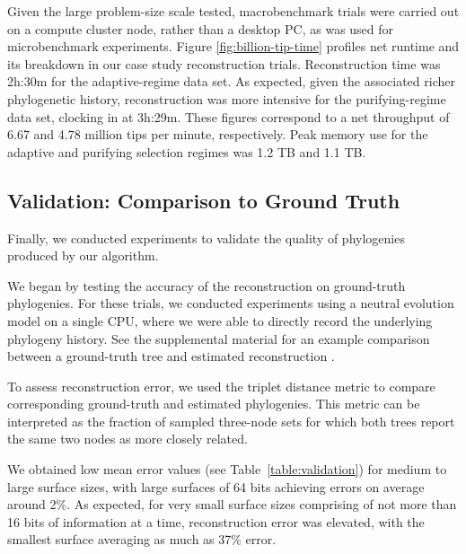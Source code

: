 Given the large problem-size scale tested, macrobenchmark trials were carried out on a compute cluster node, rather than a desktop PC, as was used for microbenchmark experiments.
Figure \ref{fig:billion-tip-time} profiles net runtime and its breakdown in our case study reconstruction trials.
Reconstruction time was 2h:30m for the adaptive-regime data set.
As expected, given the associated richer phylogenetic history, reconstruction was more intensive for the purifying-regime data set, clocking in at 3h:29m.
These figures correspond to a net throughput of 6.67 and 4.78 million tips per minute, respectively.
Peak memory use for the adaptive and purifying selection regimes was 1.2 TB and 1.1 TB.

\subsection{Validation: Comparison to Ground Truth}

Finally, we conducted experiments to validate the quality of phylogenies produced by our algorithm.

We began by testing the accuracy of the reconstruction on ground-truth phylogenies.
For these trials, we conducted experiments using a neutral evolution model on a single CPU, where we were able to directly record the underlying phylogeny history. See the supplemental material for an example comparison between a ground-truth tree and estimated reconstruction \citep{supplemental}.

To assess reconstruction error, we used the triplet distance metric to compare corresponding ground-truth and estimated phylogenies.
This metric can be interpreted as the fraction of sampled three-node sets for which both trees report the same two nodes as more closely related.



We obtained low mean error values (see Table~\ref{table:validation}) for medium to large surface sizes, with large surfaces of 64 bits achieving errors on average around 2\%. 
As expected, for very small surface sizes comprising of not more than 16 bits of information at a time, reconstruction error was elevated, with the smallest surface averaging as much as 37\% error.

